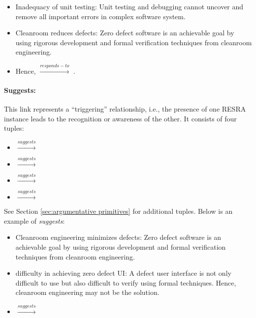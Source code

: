 \small
\begin{itemize}
\item {\sf Inadequacy of unit testing}: Unit testing and debugging cannot
  uncover and remove all important errors in complex software system.
  
\item {\sf Cleanroom reduces defects}: Zero defect software is an
  achievable goal by using rigorous development and formal verification
  techniques from cleanroom engineering.
  
\item Hence, \hspace{.1in} \(
  \stackrel{responds-to}{\longrightarrow} \) .
\end{itemize}
\normalsize


\paragraph{Suggests:}

This link represents a ``triggering'' relationship, i.e., the presence of
one RESRA instance leads to the recognition or awareness of the other. It
consists of four tuples:

\begin{itemize}
\item {} \( \stackrel{suggests}{\longrightarrow} \)
  
\item {} \( \stackrel{suggests}{\longrightarrow} \)
  
\item {} \( \stackrel{suggests}{\longrightarrow} \)
  
\item {} \( \stackrel{suggests}{\longrightarrow} \)
\end{itemize}

See Section \ref{sec:argumentative primitives} for additional tuples. Below
is an example of {\it suggests\/}:

\small
\begin{itemize}
\item {\sf Cleanroom engineering minimizes defects}: Zero defect
  software is an achievable goal by using rigorous development and formal
  verification techniques from cleanroom engineering.
  
\item {\sf difficulty in achieving zero defect UI:\/} A defect user
  interface is not only difficult to use but also difficult to verify using
  formal techniques.  Hence, cleanroom engineering may not be the solution.
  
\item {}
\( \stackrel{suggests}{\longrightarrow}\)
\end{itemize}
\normalsize

